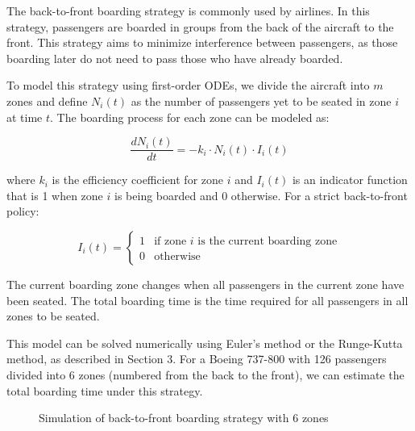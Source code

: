 \documentclass[12pt,a4paper]{article}
\begin{document}
The back-to-front boarding strategy is commonly used by airlines. In this strategy, passengers are boarded in groups from the back of the aircraft to the front. This strategy aims to minimize interference between passengers, as those boarding later do not need to pass those who have already boarded.

To model this strategy using first-order ODEs, we divide the aircraft into $m$ zones and define $N_i(t)$ as the number of passengers yet to be seated in zone $i$ at time $t$. The boarding process for each zone can be modeled as:

\begin{equation}
\frac{dN_i(t)}{dt} = -k_i \cdot N_i(t) \cdot I_i(t)
\label{eq:zone_boarding}
\end{equation}

where $k_i$ is the efficiency coefficient for zone $i$ and $I_i(t)$ is an indicator function that is 1 when zone $i$ is being boarded and 0 otherwise. For a strict back-to-front policy:

\begin{equation}
I_i(t) = 
\begin{cases}
1 & \text{if zone } i \text{ is the current boarding zone} \\
0 & \text{otherwise}
\end{cases}
\label{eq:indicator}
\end{equation}

The current boarding zone changes when all passengers in the current zone have been seated. The total boarding time is the time required for all passengers in all zones to be seated.

This model can be solved numerically using Euler's method or the Runge-Kutta method, as described in Section 3. For a Boeing 737-800 with 126 passengers divided into 6 zones (numbered from the back to the front), we can estimate the total boarding time under this strategy.

\begin{figure}[H]
\centering
{}
\caption{Simulation of back-to-front boarding strategy with 6 zones}
\label{fig:back_to_front}
\end{figure}
\end{document}
